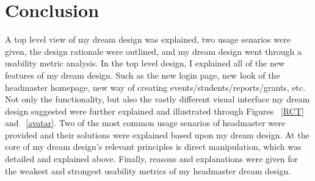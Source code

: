 \documentclass[11pt]{article}
\begin{document}
\section{Conclusion}
A top level view of my dream design was explained, two usage senarios were given, the design rationale were outlined, and my dream design went through a usability metric analysis. In the top level design, I explained all of the new features of my dream design. Such as the new login page, new look of the headmaster homepage, new way of creating events/students/reports/grants, etc. Not only the functionality, but also the vastly different visual interface my dream design suggested were further explained and illustrated through Figures ~\ref{RCT} and ~\ref{avatar}. Two of the most common usage senarios of headmaster were provided and their solutions were explained based upon my dream design. At the core of my dream design's relevant principles is direct manipulation, which was detailed and explained above. Finally, reasons and explanations were given for the weakest and strongest usability metrics of my headmaster dream design. 
\end{document}
